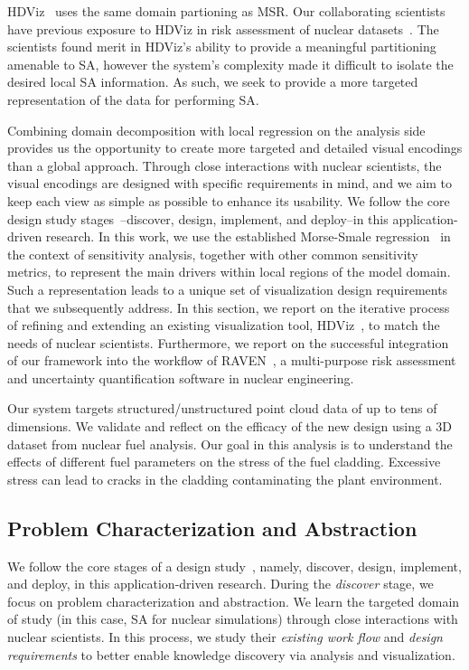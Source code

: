 HDViz~\cite{GerberBremerPascucci2010} uses the same domain partioning as MSR.
%
Our collaborating scientists have previous exposure to HDViz in risk assessment of nuclear datasets~\cite{MaljovecWangMandelli2013a,MaljovecWangPascucci2013}.
%
The scientists found merit in HDViz's ability to provide a meaningful partitioning amenable to SA, however the system's complexity made it difficult to isolate the desired local SA information.
%
As such, we seek to provide a more targeted representation of the data for performing SA.

Combining domain decomposition with local regression on the analysis side provides us the opportunity to create more targeted and detailed visual encodings than a global approach.
%
Through close interactions with nuclear scientists, the visual encodings are designed with specific requirements in mind, and we aim to keep each view as simple as possible to enhance its usability.
%
We follow the core design study stages~\cite{SedlmairMeyerMunzner2012}--discover, design, implement, and deploy--in this application-driven research.
%
In this work, we use the established Morse-Smale regression~\cite{GerberRubelBremer2011} in the context of sensitivity analysis, together with other common sensitivity metrics, to represent the main drivers within local regions of the model domain.
%
Such a representation leads to a unique set of visualization design requirements that we subsequently address.
%
In this section, we report on the iterative process of refining and extending an existing visualization tool, HDViz~\cite{GerberBremerPascucci2010}, to match the needs of nuclear scientists.
%
Furthermore, we report on the successful integration of our framework into the workflow of RAVEN~\cite{RabitiAlfonsiCogliati2015}, a multi-purpose risk assessment and uncertainty quantification software in nuclear engineering.

Our system targets structured/unstructured point cloud data of up to tens of dimensions.
%
We validate and reflect on the efficacy of the new design using a 3D dataset from nuclear fuel analysis.
%
Our goal in this analysis is to understand the effects of different fuel parameters on the stress of the fuel cladding.
%
Excessive stress can lead to cracks in the cladding contaminating the plant environment.

\subsection{Problem Characterization and Abstraction}
\label{sec:currentWorkflow}
We follow the core stages of a design study~\cite{SedlmairMeyerMunzner2012}, namely, discover, design, implement, and deploy, in this application-driven research.
%
During the \emph{discover} stage, we focus on problem characterization and abstraction.
%
We learn the targeted domain of study (in this case, SA for nuclear simulations) through close interactions with nuclear scientists.
%
In this process, we study their \emph{existing work flow} and \emph{design requirements} to better enable knowledge discovery via analysis and visualization.

